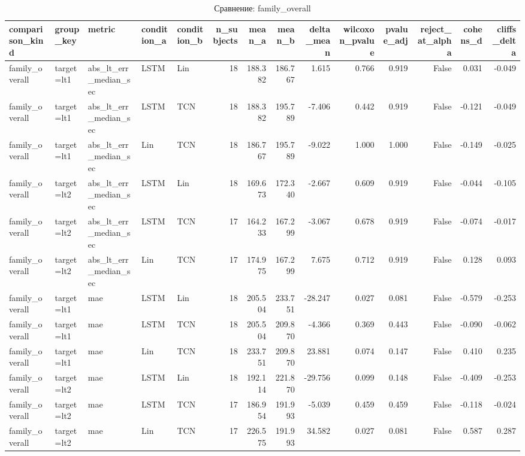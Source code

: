 \begin{table}
\caption{Сравнение: family_overall}
\label{tab:cmp_family_overall}
\begin{tabular}{lllllrrrrrrrrr}
\toprule
comparison_kind & group_key & metric & condition_a & condition_b & n_subjects & mean_a & mean_b & delta_mean & wilcoxon_pvalue & pvalue_adj & reject_at_alpha & cohens_d & cliffs_delta \\
\midrule
family_overall & target=lt1 & abs_lt_err_median_sec & LSTM & Lin & 18 & 188.382 & 186.767 & 1.615 & 0.766 & 0.919 & False & 0.031 & -0.049 \\
family_overall & target=lt1 & abs_lt_err_median_sec & LSTM & TCN & 18 & 188.382 & 195.789 & -7.406 & 0.442 & 0.919 & False & -0.121 & -0.049 \\
family_overall & target=lt1 & abs_lt_err_median_sec & Lin & TCN & 18 & 186.767 & 195.789 & -9.022 & 1.000 & 1.000 & False & -0.149 & -0.025 \\
family_overall & target=lt2 & abs_lt_err_median_sec & LSTM & Lin & 18 & 169.673 & 172.340 & -2.667 & 0.609 & 0.919 & False & -0.044 & -0.105 \\
family_overall & target=lt2 & abs_lt_err_median_sec & LSTM & TCN & 17 & 164.233 & 167.299 & -3.067 & 0.678 & 0.919 & False & -0.074 & -0.017 \\
family_overall & target=lt2 & abs_lt_err_median_sec & Lin & TCN & 17 & 174.975 & 167.299 & 7.675 & 0.712 & 0.919 & False & 0.128 & 0.093 \\
family_overall & target=lt1 & mae & LSTM & Lin & 18 & 205.504 & 233.751 & -28.247 & 0.027 & 0.081 & False & -0.579 & -0.253 \\
family_overall & target=lt1 & mae & LSTM & TCN & 18 & 205.504 & 209.870 & -4.366 & 0.369 & 0.443 & False & -0.090 & -0.062 \\
family_overall & target=lt1 & mae & Lin & TCN & 18 & 233.751 & 209.870 & 23.881 & 0.074 & 0.147 & False & 0.410 & 0.235 \\
family_overall & target=lt2 & mae & LSTM & Lin & 18 & 192.114 & 221.870 & -29.756 & 0.099 & 0.148 & False & -0.409 & -0.253 \\
family_overall & target=lt2 & mae & LSTM & TCN & 17 & 186.954 & 191.993 & -5.039 & 0.459 & 0.459 & False & -0.118 & -0.024 \\
family_overall & target=lt2 & mae & Lin & TCN & 17 & 226.575 & 191.993 & 34.582 & 0.027 & 0.081 & False & 0.587 & 0.287 \\
\bottomrule
\end{tabular}
\end{table}
